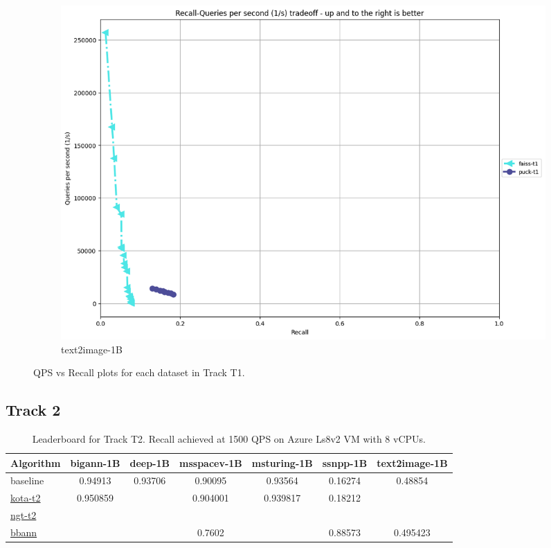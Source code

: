 \begin{figure}[ht]
\begin{subfigure}{0.48\textwidth}
    \includegraphics[width=\linewidth]{../t1_t2/results/T1/neurips21/text2image-1B.png}
    \caption{text2image-1B}
  \end{subfigure}
      
  \caption{QPS vs Recall plots for each dataset in Track T1.}
  
\end{figure}

\subsection{Track 2}
\begin{table}
  \caption{Leaderboard for Track T2. Recall achieved at 1500 QPS on Azure Ls8v2 VM with 8 vCPUs.}
  \begin{tabular}{l|c|c|c|c|c|c}
    \hline
    Algorithm & bigann-1B  & deep-1B & msspacev-1B & msturing-1B &   ssnpp-1B  &     text2image-1B \\
    \hline
    baseline &  0.94913 & 0.93706 & 0.90095 & 0.93564 & 0.16274 & 0.48854 \\
    \hline
    \href{https://github.com/harsha-simhadri/big-ann-benchmarks/pull/62}{kota-t2} & 0.950859 & & 0.904001 & 0.939817 & 0.18212 & \\
    \href{https://github.com/harsha-simhadri/big-ann-benchmarks/pull/6}{ngt-t2} & & & & & & \\
    \href{https://github.com/harsha-simhadri/big-ann-benchmarks/pull/70}{bbann} & & & 0.7602 & & 0.88573 & 0.495423 \\
    \hline
     
  \end{tabular}
  
\end{table}



